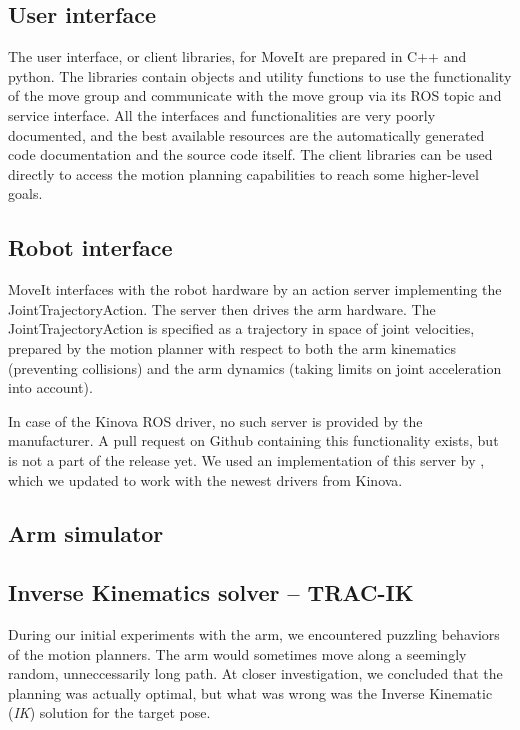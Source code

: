 \documentclass[buriama8_dp.tex]{subfiles}
\begin{document}
\subsection{User interface}
\label{subsec:moveit_ui}

The user interface, or client libraries, for MoveIt are prepared in C++ and python. The libraries contain objects and utility functions to use the functionality of the move group and communicate with the move group via its ROS topic and service interface. All the interfaces and functionalities are very poorly documented, and the best available resources are the automatically generated code documentation and the source code itself. The client libraries can be used directly to access the motion planning capabilities to reach some higher-level goals.


\subsection{Robot interface}
\label{subsec:moveit_ri}

MoveIt interfaces with the robot hardware by an action server implementing the JointTrajectoryAction. The server then drives the arm hardware. The JointTrajectoryAction is specified as a trajectory in space of joint velocities, prepared by the motion planner with respect to both the arm kinematics (preventing collisions) and the arm dynamics (taking limits on joint acceleration into account).

In case of the Kinova ROS driver, no such server is provided by the manufacturer. A pull request on Github containing this functionality exists, but is not a part of the release yet. We used an implementation of this server by , which we updated to work with the newest drivers from Kinova.

\subsection{Arm simulator}
\label{subsec:arm_sim}


\subsection{Inverse Kinematics solver -- TRAC-IK}
\label{subsec:tracik}

During our initial experiments with the arm, we encountered puzzling behaviors of the motion planners. The arm would sometimes move along a seemingly random, unneccessarily long path. At closer investigation, we concluded that the planning was actually optimal, but what was wrong was the Inverse Kinematic (\emph{IK}) solution for the target pose.
\end{document}
